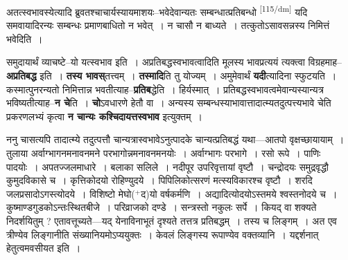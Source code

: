 \documentclass[article,12pt,a4paper]{memoir}
\newcommand{\add}[1]{($^{+}$#1)}
\begin{document}
	  \pstart अतत्स्वभावस्येत्यादि ब्रुवतश्चाचार्यस्यायमाशयः--भवेदेवान्यतः सम्बन्धात्प्रतिबन्धो  \leavevmode\textsuperscript{\rmlatinfont\tiny [115/dm]} यदि समवायादिरन्यः सम्बन्धः प्रमाणबाधितो न भवेत् । न चासौ न बाध्यते । तत्कुतोऽसावसन्नस्य निमित्तं भवेदिति ।
	\pend
      

	  \pstart समुदायार्थं व्याचष्टे--यो यत्स्वभाव इति । अप्रतिबद्धस्वभावत्वादिति मूलस्य भावप्रत्ययं त्यक्त्वा विग्रहमाह--\textbf{अप्रतिबद्ध} इति । \textbf{तस्य भावस्}तत्त्वम् । \textbf{तस्मादि}ति तु योज्यम् । अमुमेवार्थं \textbf{यदी}त्यादिना स्फुटयति । कस्मात्पुनरन्यतो निमित्तान्न भवतीत्याह--\textbf{प्रतिब}द्धेति । हिर्यस्मात् । प्रतिबद्धस्वभावत्वमेवान्यस्यान्यत्र भविष्यतीत्याह--\textbf{न चे}ति । \textbf{चो}ऽवधारणे हेतौ वा । अन्यस्य सम्बन्धस्याभावात्तादात्म्यतदुत्पत्त्यभावे चेति प्रकरणलभ्यं कृत्वा \textbf{न चान्यः कश्चिदायत्तस्वभाव} इत्युक्तम् ।
	\pend
      

	  \pstart ननु चासत्यपि तादात्म्ये तदुत्पत्तौ चान्यत्रास्वभावेऽनुत्पादके चान्यत्प्रतिबद्धं यथा—आतपो वृक्षच्छायायाम् । तुलाया अर्वाग्भागनमनावनमने परभागोन्नमनावनमनयोः । अर्वाग्भागः परभागे । रसो रूपे । पाणिः पादयोः । अपतज्जलमाधारे । बलाका सलिले । नदीपूर उपरिवृत्तायां वृष्टौ । चन्द्रोदयः समुद्रवृद्धौ कुमुदविकासे च । कृत्तिकोदयो रोहिण्युदये । पिपिलिकोत्सरणं मत्स्यविकारश्च वृष्टौ । शरदि जलप्रसादोऽगस्त्योदये । विशिष्टो मेघो\add{द}यो वर्षकर्मणि । अद्यादित्योदयोऽस्तमये श्वस्तनोदये च । कुष्माण्डगुडकोऽन्तःस्थितबीजे । परिव्राजको दण्डे । सन्त्रस्तो नकुलः सर्पे । कियद् वा शक्यते निदर्शयितुम् ? एतावत्तूच्यते—यद् येनाविनाभूतं दृश्यते तत्तत्र प्रतिबद्धम् । तस्य च लिङ्गम् । अत एव त्रीण्येव लिङ्गानीति संख्यानियमोऽप्ययुक्तः । केवलं लिङ्गस्य रूपाण्येव वक्तव्यानि । यद्दर्शनात् हेतुत्वमवसीयत इति ।
	\pend
      
\end{document}
